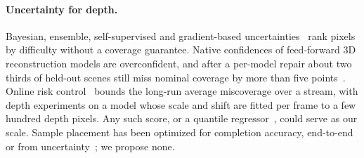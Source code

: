 \paragraph{Uncertainty for depth.}
Bayesian, ensemble, self-supervised and gradient-based uncertainties~\cite{kendall2017uncertainties,lakshminarayanan2017ensembles,poggi2020uncertainty,hornauer2022gradient} rank pixels by difficulty without a coverage guarantee.
Native confidences of feed-forward 3D reconstruction models are overconfident, and after a per-model repair about two thirds of held-out scenes still miss nominal coverage by more than five points~\cite{deng2026calibrationaudit}.
Online risk control~\cite{feldman2023onlinerisk} bounds the long-run average miscoverage over a stream, with depth experiments on a model whose scale and shift are fitted per frame to a few hundred depth pixels.
Any such score, or a quantile regressor~\cite{romano2019cqr}, could serve as our scale.
Sample placement has been optimized for completion accuracy, end-to-end~\cite{bergman2020adaptivelidar} or from uncertainty~\cite{taguchi2023interactive}; we propose none.
